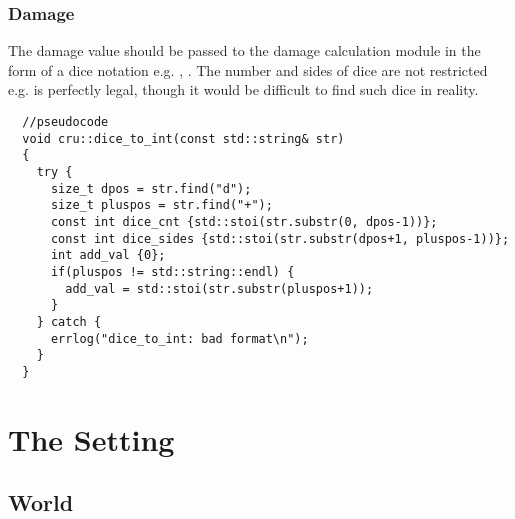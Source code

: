 \documentclass[a4paper,10pt]{book}
\begin{document}
\section{Damage}
The damage value should be passed to the damage calculation module in the form
of a dice notation e.g. , .
The number and sides of dice are not restricted e.g.  is perfectly legal,
though it would be difficult to find such dice in reality.
\begin{verbatim}
  //pseudocode
  void cru::dice_to_int(const std::string& str)
  {
    try {
      size_t dpos = str.find("d");
      size_t pluspos = str.find("+");
      const int dice_cnt {std::stoi(str.substr(0, dpos-1))};
      const int dice_sides {std::stoi(str.substr(dpos+1, pluspos-1))};
      int add_val {0};
      if(pluspos != std::string::endl) {
        add_val = std::stoi(str.substr(pluspos+1));
      }
    } catch {
      errlog("dice_to_int: bad format\n");
    }
  }
\end{verbatim}

\part{The Setting}
\chapter{World}
\end{document}
